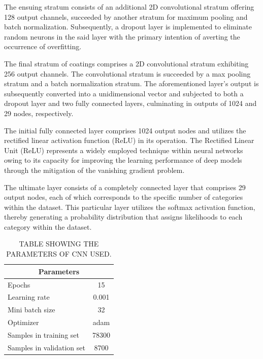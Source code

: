 \documentclass[conference]{IEEEtran}
\begin{document}
The ensuing stratum consists of an additional 2D convolutional stratum offering 128 output channels, succeeded by another stratum for maximum pooling and batch normalization. Subsequently, a dropout layer is implemented to eliminate random neurons in the said layer with the primary intention of averting the occurrence of overfitting.

The final stratum of coatings comprises a 2D convolutional stratum exhibiting 256 output channels. The convolutional stratum is succeeded by a max pooling stratum and a batch normalization stratum. The aforementioned layer's output is subsequently converted into a unidimensional vector and subjected to both a dropout layer and two fully connected layers, culminating in outputs of 1024 and 29 nodes, respectively.

The initial fully connected layer comprises 1024 output nodes and utilizes the rectified linear activation function (ReLU) in its operation. The Rectified Linear Unit (ReLU) represents a widely employed technique within neural networks owing to its capacity for improving the learning performance of deep models through the mitigation of the vanishing gradient problem.

The ultimate layer consists of a completely connected layer that comprises 29 output nodes, each of which corresponds to the specific number of categories within the dataset. This particular layer utilizes the softmax activation function, thereby generating a probability distribution that assigns likelihoods to each category within the dataset.

\begin{table}[!t]
\centering
\caption{TABLE SHOWING THE PARAMETERS OF CNN USED.}
\label{tab:CCN-param} 
\begin{tabular}{|l|c|}
\hline
\multicolumn{2}{|c|}{\textbf{Parameters}} \\ \hline
Epochs & 15 \\
Learning rate & 0.001 \\
Mini batch size & 32 \\ 
Optimizer & adam \\
Samples in training set & 78300 \\
Samples in validation set & 8700 \\ \hline
\end{tabular}
\end{table}
\end{document}
